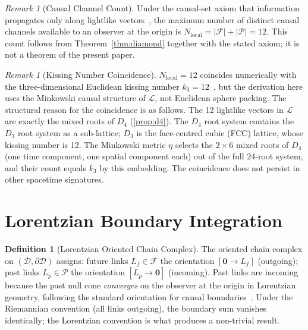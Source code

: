 \documentclass[12pt, a4paper]{article}
\theoremstyle{plain}
\theoremstyle{definition}
\newtheorem{definition}[theorem]{Definition}
\theoremstyle{remark}
\newtheorem{remark}[theorem]{Remark}
\newcommand{\Lat}{\mathscr{L}}
\newcommand{\CD}{\mathscr{D}}
\newcommand{\BdyCD}{\partial\mathscr{D}}
\newcommand{\LL}{\mathcal{L}}
\newcommand{\FS}{\mathcal{F}}
\newcommand{\PS}{\mathcal{P}}
\newcommand{\Nloc}{N_{\mathrm{local}}}
\begin{document}
\begin{remark}[Causal Channel Count]\label{rem:bandwidth}
Under the causal-set axiom that information propagates only along
lightlike vectors~\cite{Bombelli1987,Henson2006}, the maximum
number of distinct causal channels available to an observer at the
origin is $\Nloc = |\FS| + |\PS| = 12$.
This count follows from Theorem~\ref{thm:diamond} together with the
stated axiom; it is not a theorem of the present paper.
\end{remark}

\begin{remark}[Kissing Number Coincidence]\label{rem:kissing}
$\Nloc = 12$ coincides numerically with the three-dimensional
Euclidean kissing number $k_3=12$~\cite{SchuetteMaass1953},
but the derivation here uses the Minkowski causal structure of
$\Lat$, not Euclidean sphere packing.
The structural reason for the coincidence is as follows.
The 12 lightlike vectors in $\LL$ are exactly the mixed roots of
$D_4$ (\cref{prop:d4}).
The $D_4$ root system contains the $D_3$ root system as a
sub-lattice; $D_3$ is the face-centred cubic (FCC) lattice, whose
kissing number is 12.
The Minkowski metric $\eta$ selects the $2\times6$ mixed roots of
$D_4$ (one time component, one spatial component each) out of the
full 24-root system, and their count equals $k_3$ by this embedding.
The coincidence does not persist in other spacetime signatures.
\end{remark}

\section{Lorentzian Boundary Integration}\label{sec:boundary}

\begin{definition}[Lorentzian Oriented Chain Complex]\label{def:chain}
The oriented chain complex on $(\CD,\BdyCD)$ assigns:
future links $L_f\in\FS$ the orientation $[\bm{0}\to L_f]$
(outgoing);
past links $L_p\in\PS$ the orientation $[L_p\to\bm{0}]$
(incoming).
Past links are incoming because the past null cone
\emph{converges} on the observer at the origin in Lorentzian
geometry, following the standard orientation for causal
boundaries~\cite{Penrose1972, WaldGR}.
Under the Riemannian convention (all links outgoing),
the boundary sum vanishes identically; the Lorentzian
convention is what produces a non-trivial result.
\end{definition}
\end{document}
